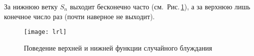 За нижнюю ветку $S_n$ выходит бесконечно часто (см.~Рис.\,\ref{pic:lrl}), а за верхнюю лишь конечное число раз (почти наверное не выходит).
\begin{figure}[h!]
	\centering
	\texttt{[image: lrl]}
	\caption{Поведение верхней и нижней функции случайного блуждания}
	\label{pic:lrl}
\end{figure}